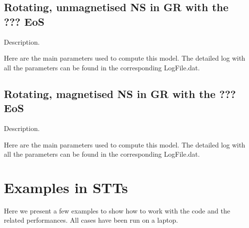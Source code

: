 \documentclass[letterpaper,10pt,english]{sphinxmanual}
\begin{document}
\section{Rotating, unmagnetised NS in GR with the ??? EoS}
\label{\detokenize{examples_gr:rotating-unmagnetised-ns-in-gr-with-the-eos}}
\sphinxAtStartPar
Description.

\sphinxAtStartPar
Here are the main parameters used to compute this model. The detailed log with all the parameters can be found in the corresponding LogFile.dat.

\begin{sphinxVerbatim}[commandchars=\\\{\}]
            
\end{sphinxVerbatim}


\section{Rotating, magnetised NS in GR with the ??? EoS}
\label{\detokenize{examples_gr:rotating-magnetised-ns-in-gr-with-the-eos}}
\sphinxAtStartPar
Description.

\sphinxAtStartPar
Here are the main parameters used to compute this model. The detailed log with all the parameters can be found in the corresponding LogFile.dat.

\begin{sphinxVerbatim}[commandchars=\\\{\}]
            
\end{sphinxVerbatim}


\chapter{Examples in STTs}
\label{\detokenize{examples_stt:examples-in-stts}}\label{\detokenize{examples_stt::doc}}
\sphinxAtStartPar
Here we present a few examples to show how to work with the code and the related performances. All
cases have been run on a laptop.
\end{document}
